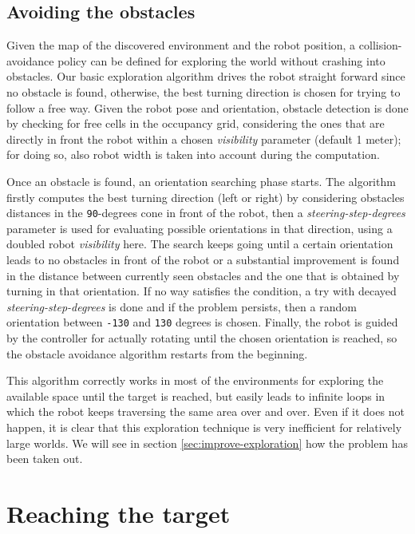 \documentclass[9pt,conference]{IEEEtran}
\begin{document}
\subsection{Avoiding the obstacles}
\label{sec:obstacle-avoidance}

Given the map of the discovered environment and the robot position, a collision-avoidance policy can be defined for exploring the world without crashing into obstacles. Our basic exploration algorithm drives the robot straight forward since no obstacle is found, otherwise, the best turning direction is chosen for trying to follow a free way. Given the robot pose and orientation, obstacle detection is done by checking for free cells in the occupancy grid, considering the ones that are directly in front the robot within a chosen \textit{visibility} parameter (default 1 meter); for doing so, also robot width is taken into account during the computation.

Once an obstacle is found, an orientation searching phase starts. The algorithm firstly computes the best turning direction (left or right) by considering obstacles distances in the \texttt{90}-degrees cone in front of the robot, then a \textit{steering-step-degrees} parameter is used for evaluating possible orientations in that direction, using a doubled robot \textit{visibility} here. The search keeps going until a certain orientation leads to no obstacles in front of the robot or a substantial improvement is found in the distance between currently seen obstacles and the one that is obtained by turning in that orientation. If no way satisfies the condition, a try with decayed \textit{steering-step-degrees} is done and if the problem persists, then a random orientation between \texttt{-130} and \texttt{130} degrees is chosen.
Finally, the robot is guided by the controller for actually rotating until the chosen orientation is reached, so the obstacle avoidance algorithm restarts from the beginning.

This algorithm correctly works in most of the environments for exploring the available space until the target is reached, but easily leads to infinite loops in which the robot keeps traversing the same area over and over. Even if it does not happen, it is clear that this exploration technique is very inefficient for relatively large worlds. We will see in section \ref{sec:improve-exploration} how the problem has been taken out.




\section{Reaching the target}
\label{sec:target-chasing}
\end{document}
